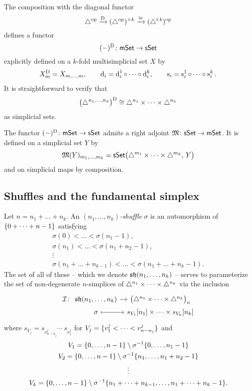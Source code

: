 The composition with the diagonal functor
\[
\triangle^{\mathrm{op}} \xrightarrow{\mathrm{D}}
(\triangle^{\mathrm{op}})^{\times k} \xrightarrow{\cong}
(\triangle^{\!\times\mathit{k}})^{\mathrm{op}}
\]
defines a functor
\[
(-)^{\mathrm{D}} \colon \mathsf{mSet} \to \mathsf{sSet}
\]
explicitly defined on a $k$-fold multisimplicial set $X$ by
\begin{gather*}
X^{\mathrm{D}}_m = X_{m, \dots, m},
\qquad
\operatorname{d}_i = \operatorname{d}_i^1 \circ \dots \circ \operatorname{d}_i^k,
\qquad
\operatorname{s}_i = \operatorname{s}_i^1 \circ \dots \circ \operatorname{s}_i^k.
\end{gather*}
It is straightforward to verify that
\[
\big( \triangle^{n_1, \dots, n_k} \big)^{\mathrm{D}} \cong
\triangle^{n_1} \times \dots \times \triangle^{n_k}
\]
as simplicial sets.

The functor $(-)^{\mathrm{D}} \colon \mathsf{mSet} \to \mathsf{sSet}$ admits a right adjoint $\operatorname{\mathfrak{M}} \colon \mathsf{sSet} \to \mathsf{mSet}$.
It is defined on a simplicial set $Y$ by
\[
\operatorname{\mathfrak{M}}(Y)_{m_1, \dots, m_k} =
\mathsf{sSet}\big( \triangle^{m_1} \times \dots \times \triangle^{m_k}, \, Y \big)
\]
and on simplicial maps by composition.

\subsection{Shuffles and the fundamental simplex} \label{ss:shuffles and fundamental simplex}

Let $n = n_1 + \dots + n_k$.
An \textit{$(n_1, \dots, n_k)$-shuffle} $\sigma$ is an automorphism of $\{0 + \dots + n-1\}$ satisfying
\begin{gather*}
	\sigma(0) < \dots < \sigma(n_1-1), \\
	\sigma(n_1) < \dots < \sigma(n_1+n_2-1), \\
	\vdots \\
	\sigma(n_1+\dots+n_{k-1}) < \dots < \sigma(n_1+\dots+n_k-1).
\end{gather*}
The set of all of these -- which we denote $\operatorname{\mathfrak{sh}}(n_1, \dots, n_k)$ -- serves to parameterize the set of non-degenerate $n$-simplices of $\triangle^{n_1} \times \dots \times \triangle^{n_k}$ via the inclusion
\[
\begin{tikzcd}[column sep=tiny, row sep=0]
	\cI \colon &[-10pt]
	\sh(n_1, \dots, n_k) \arrow[r] &
	\big(\simplex^{n_1} \times \dots \times \simplex^{n_k}\big)_n \\ &
	\sigma \arrow[r, mapsto] &
	s_{V_1} [n_1] \times \dots \times s_{V_k} [n_k]
\end{tikzcd}
\]
where $s_{V_j} = s_{v_{n-n_j}^j} \dotsb \ s_{v_1^j}$ for $V_j = \{v_1^j < \dots < v_{n-n_j}^j\}$ and
\begin{gather*}
	V_1 = \{0,\dots,n-1\} \setminus \sigma^{-1} \{0,\dots,n_1-1\} \\
	V_2 = \{0,\dots,n-1\} \setminus \sigma^{-1} \{n_1, \dots, n_1+n_2-1\} \\
	\vdots \\
	V_k = \{0,\dots,n-1\} \setminus \sigma^{-1} \{n_1+\dots+n_{k-1}, \dots, n_1+\dots+n_k-1\}.
\end{gather*}

